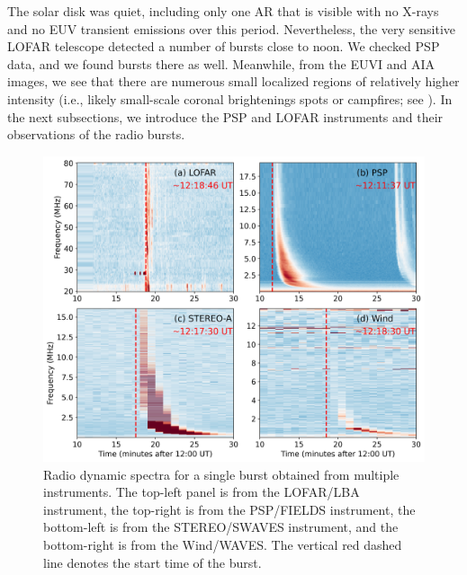 The solar disk was quiet, including only one AR that is visible with no X-rays and no EUV transient emissions over this period.
Nevertheless, the very sensitive LOFAR telescope detected a number of bursts close to noon. We checked PSP data, and we found bursts there as well.
Meanwhile, from the EUVI and AIA images, we see that there are numerous small localized regions of relatively higher intensity (i.e., likely small-scale coronal brightenings spots or campfires; see \citet{young18, madjarska19, berghmans21}).
In the next subsections, we introduce the PSP and LOFAR instruments and their observations of the radio bursts.

\begin{figure}
\centering
\includegraphics[width=0.9\hsize]{chapter2/figs/all_dyspec.png}
\caption{Radio dynamic spectra for a single burst obtained from multiple instruments. The top-left panel is from the LOFAR/LBA instrument, the top-right is from the PSP/FIELDS instrument, the bottom-left is from the STEREO/SWAVES instrument, and the bottom-right is from the Wind/WAVES. The vertical red dashed line denotes the start time of the burst.}
\label{fig_alldyspec}
\end{figure}

